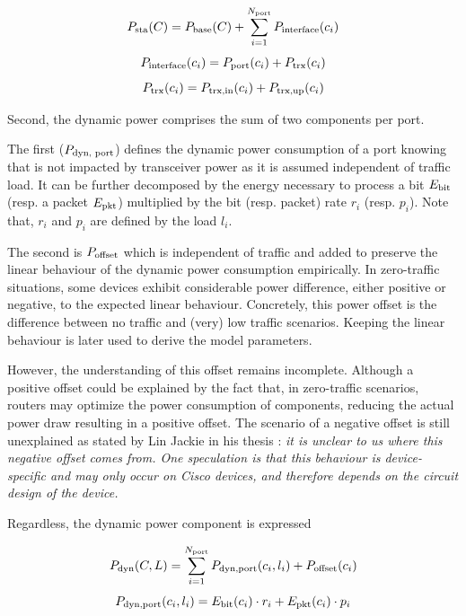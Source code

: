\begin{equation}
	P_{\textnormal{sta}}(C) = P_{\textnormal{base}}(C) + \sum_{i=1}^{N_{\textnormal{port}}}  P_{\textnormal{interface}}(c_i)
\end{equation}
\begin{equation}
	P_{\textnormal{interface}}(c_i) = P_{\textnormal{port}}(c_i) + P_{\textnormal{trx}}(c_i)
\end{equation}
\begin{equation}
	P_{\textnormal{trx}}(c_i) = P_{\textnormal{trx,in}}(c_i) + P_{\textnormal{trx,up}}(c_i)
\end{equation}

Second, the dynamic power comprises the sum of two components per port.

The first ($P_{\textnormal{dyn, port}}$) defines the dynamic power consumption of a port knowing that is not impacted by transceiver power as it is assumed independent of traffic load.
It can be further decomposed by the energy necessary to process a bit $E_\textnormal{bit}$ (resp. a packet $E_\textnormal{pkt}$) multiplied by the bit (resp. packet) rate $r_i$ (resp. $p_i$). 
Note that, $r_i$ and $p_i$ are defined by the load $l_i$.

The second is $P_\textnormal{offset}$ which is independent of traffic and added to preserve the linear behaviour of the dynamic power consumption empirically.
In zero-traffic situations, some devices exhibit considerable power difference, either positive or negative, to the expected linear behaviour. 
Concretely, this power offset is the difference between no traffic and (very) low traffic scenarios.
Keeping the linear behaviour is later used to derive the model parameters. 

However, the understanding of this offset remains incomplete.
Although a positive offset could be explained by the fact that, in zero-traffic scenarios, routers may optimize the power consumption of components, reducing the actual power draw resulting in a positive offset.
The scenario of a negative offset is still unexplained as stated by Lin Jackie in his thesis \cite{lim} : \textit{ it is unclear to us where this negative offset comes from. One speculation is that this behaviour is device-specific and may only occur on Cisco devices, and therefore depends on the circuit design of the device.} 

Regardless, the dynamic power component is expressed

\begin{equation}
	P_{\textnormal{dyn}}(C,L) = \sum_{i=1}^{N_\textnormal{port}} P_{\textnormal{dyn,port}}(c_i,l_i) + P_\textnormal{offset}(c_i)
\end{equation}
\begin{equation}
	P_{\textnormal{dyn,port}}(c_i,l_i) = E_\textnormal{bit}(c_i) \cdot r_i + E_\textnormal{pkt}(c_i) \cdot p_i 
\end{equation}


